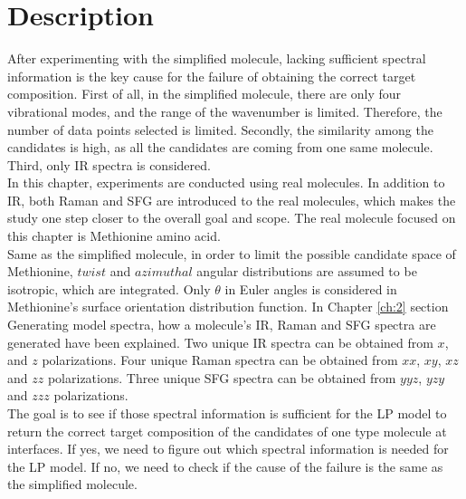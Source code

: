  \label{ch:4}
\section{Description}

After experimenting with the simplified molecule, lacking sufficient spectral information is the key cause for the failure of obtaining the correct target composition. First of all, in the simplified molecule, there are only four vibrational modes, and the range of the wavenumber is limited. Therefore, the number of data points selected is limited. Secondly, the similarity among the candidates is high, as all the candidates are coming from one same molecule.  Third, only IR spectra is considered. \\

In this chapter, experiments are conducted using real molecules. In addition to IR, both Raman and SFG are introduced to the real molecules, which makes the study one step closer to the overall goal and scope. The real molecule focused on this chapter is Methionine amino acid. \\

Same as the simplified molecule, in order to limit the possible candidate space of Methionine, $twist$ and $azimuthal$ angular distributions are assumed to be isotropic, which are integrated. Only $\theta$ in Euler angles is considered in Methionine's surface orientation distribution function. In Chapter \ref{ch:2} section Generating model spectra, how a molecule's IR, Raman and SFG spectra are generated have been explained. Two unique IR spectra can be obtained from $x$, and $z$ polarizations. Four unique Raman spectra can be obtained from $xx$, $xy$, $xz$ and $zz$ polarizations. Three unique SFG spectra can be obtained from $yyz$, $yzy$ and $zzz$ polarizations.\\

The goal is to see if those spectral information is sufficient for the LP model to return the correct target composition of the candidates of one type molecule at interfaces. If yes, we need to figure out which spectral information is needed for the LP model. If no, we need to check if the cause of the failure is the same as the simplified molecule. \\

